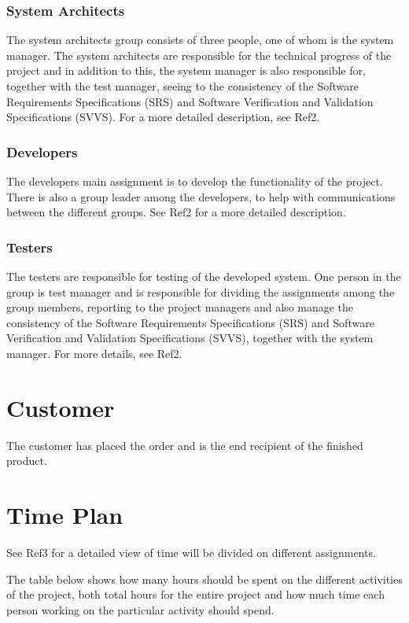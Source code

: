 \documentclass[a4paper]{article}
\begin{document}
\subsubsection{System Architects}
The system architects group consists of three people, one of whom is the system manager. The system architects are responsible for the technical progress of the project and in addition to this, the system manager is also responsible for, together with the test manager, seeing to the consistency of the Software Requirements Specifications (SRS) and Software Verification and Validation Specifications (SVVS). For a more detailed description, see Ref2.

\subsubsection{Developers}
The developers main assignment is to develop the functionality of the project. There is also a group leader among the developers, to help with communications between the different groups. See Ref2 for a more detailed description.

\subsubsection{Testers}
The testers are responsible for testing of the developed system. One person in the group is test manager and is responsible for dividing the assignments among the group members, reporting to the project managers and also manage the consistency of the Software Requirements Specifications (SRS) and Software Verification and Validation Specifications (SVVS), together with the system manager. For more details, see Ref2.

\section{Customer}
The customer has placed the order and is the end recipient of the finished product.

\section{Time Plan}
See Ref3 for a detailed view of time will be divided on different assignments.

The table below shows how many hours should be spent on the different activities of the project, both total hours for the entire project and how much time each person working on the particular activity should spend.
\end{document}
